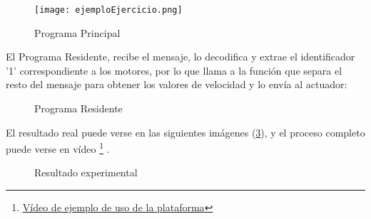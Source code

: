 \begin{figure}[h]
	\centering
	\texttt{[image: ejemploEjercicio.png]}
	\label{img:ProgramaPrincipal}
	\caption{Programa Principal}
\end{figure} 
 
El Programa Residente, recibe el mensaje, lo decodifica y extrae el identificador '1' correspondiente a los motores, por lo que llama a la función que separa el resto del mensaje para obtener los valores de velocidad y lo envía al actuador:

\begin{figure}[H]
	\centering
	\begin{subfigure}
		[Extraer el identificador]{
			\texttt{[image: ejemploEjercicio2.png]}
			\label{img:ejemplo2}}
	\end{subfigure}
	\begin{subfigure}
		[Decodificar mensaje completo]{
			\texttt{[image: ejemploEjercicio3.png]}
			\label{img:ejemplo3}}
	\end{subfigure}
	\label{img:ProgramaResidente}
	\caption{Programa Residente}
\end{figure}

El resultado real puede verse en las siguientes imágenes (\ref{img:Resultadoexperimental}), y el proceso completo puede verse en vídeo \footnote{\href{https://www.youtube.com/watch?v=GbFC0OJPLk0}{Vídeo de ejemplo de uso de la plataforma}} .


\begin{figure}[H]
	\centering
	\begin{subfigure}[b]
		[Ejecución programa Principal]{
			\centering
			\texttt{[image: ejemploEjercicio4.png]}
			\label{img:ejemplo4}}
	\end{subfigure}
\newline
	\begin{subfigure}[b]
		[mBot]{
			\centering
			\texttt{[image: ejemploEjercicio5.png]}
			\label{img:ejemplo5}}
	\end{subfigure}	
	\caption{Resultado experimental}
	\label{img:Resultadoexperimental}
\end{figure}